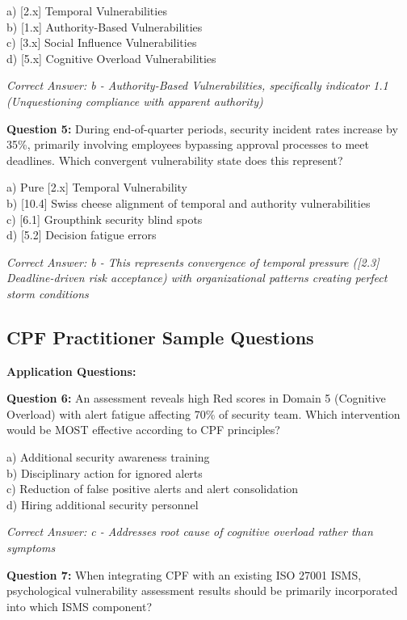 \documentclass[11pt,a4paper]{article}
\begin{document}
a) [2.x] Temporal Vulnerabilities\\
b) [1.x] Authority-Based Vulnerabilities\\
c) [3.x] Social Influence Vulnerabilities\\
d) [5.x] Cognitive Overload Vulnerabilities

\textit{Correct Answer: b - Authority-Based Vulnerabilities, specifically indicator 1.1 (Unquestioning compliance with apparent authority)}

\textbf{Question 5:} During end-of-quarter periods, security incident rates increase by 35\%, primarily involving employees bypassing approval processes to meet deadlines. Which convergent vulnerability state does this represent?

a) Pure [2.x] Temporal Vulnerability\\
b) [10.4] Swiss cheese alignment of temporal and authority vulnerabilities\\
c) [6.1] Groupthink security blind spots\\
d) [5.2] Decision fatigue errors

\textit{Correct Answer: b - This represents convergence of temporal pressure ([2.3] Deadline-driven risk acceptance) with organizational patterns creating perfect storm conditions}

\subsection{CPF Practitioner Sample Questions}

\textbf{Application Questions:}

\textbf{Question 6:} An assessment reveals high Red scores in Domain 5 (Cognitive Overload) with alert fatigue affecting 70\% of security team. Which intervention would be MOST effective according to CPF principles?

a) Additional security awareness training\\
b) Disciplinary action for ignored alerts\\
c) Reduction of false positive alerts and alert consolidation\\
d) Hiring additional security personnel

\textit{Correct Answer: c - Addresses root cause of cognitive overload rather than symptoms}

\textbf{Question 7:} When integrating CPF with an existing ISO 27001 ISMS, psychological vulnerability assessment results should be primarily incorporated into which ISMS component?
\end{document}
